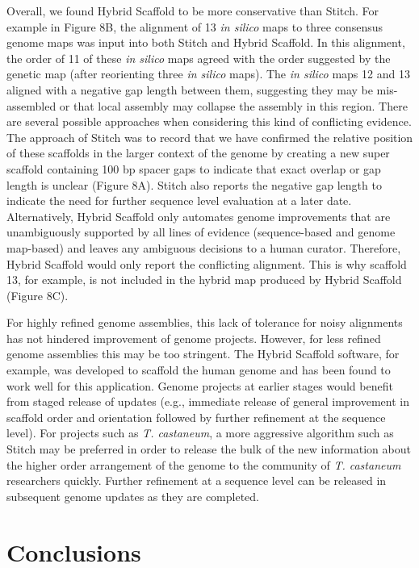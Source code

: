 \documentclass{bmcart}
\begin{document}
Overall, we found Hybrid Scaffold to be more conservative than Stitch. For example in Figure 8B, the alignment of 13 \textit{in silico} maps to three consensus genome maps was input into both Stitch and Hybrid Scaffold. In this alignment, the order of 11 of these \textit{in silico} maps agreed with the order suggested by the genetic map (after reorienting three \textit{in silico} maps). The \textit{in silico} maps 12 and 13 aligned with a negative gap length between them, suggesting they may be mis-assembled or that local assembly may collapse the assembly in this region. There are several possible approaches when considering this kind of conflicting evidence. The approach of Stitch was to record that we have confirmed the relative position of these scaffolds in the larger context of the genome by creating a new super scaffold containing 100 bp spacer gaps to indicate that exact overlap or gap length is unclear (Figure 8A). Stitch also reports the negative gap length to indicate the need for further sequence level evaluation at a later date. Alternatively, Hybrid Scaffold only automates genome improvements that are unambiguously supported by all lines of evidence (sequence-based and genome map-based) and leaves any ambiguous decisions to a human curator. Therefore, Hybrid Scaffold would only report the conflicting alignment. This is why scaffold 13, for example, is not included in the hybrid map produced by Hybrid Scaffold (Figure 8C). 

For highly refined genome assemblies, this lack of tolerance for noisy alignments has not hindered improvement of genome projects. However, for less refined genome assemblies this may be too stringent. The Hybrid Scaffold software, for example, was developed to scaffold the human genome and has been found to work well for this application. Genome projects at earlier stages would benefit from staged release of updates (e.g., immediate release of general improvement in scaffold order and orientation followed by further refinement at the sequence level). For projects such as \textit{T. castaneum}, a more aggressive algorithm such as Stitch may be preferred in order to release the bulk of the new information about the higher order arrangement of the genome to the community of \textit{T. castaneum} researchers quickly. Further refinement at a sequence level can be released in subsequent genome updates as they are completed.

\section*{Conclusions}
\end{document}
